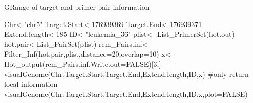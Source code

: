 \documentclass[a4paper]{book}
\begin{document}
%
\begin{Value}
GRange of target and primer pair information
\end{Value}
%
\begin{Examples}
\begin{ExampleCode}
Chr<-"chr5"
Target.Start<-176939369
Target.End<-176939371
Extend.length<-185
ID<-"leukemia_36"
plist<- List_PrimerSet(hot.out)
hot.pair<-List_PairSet(plist)
rem_Pairs.inf<-Filter_Inf(hot.pair,plist,distance=20,overlap=10)
x<-Hot_output(rem_Pairs.inf,Write.out=FALSE)[3,]
visualGenome(Chr,Target.Start,Target.End,Extend.length,ID,x)
#only return local information
visualGenome(Chr,Target.Start,Target.End,Extend.length,ID,x,plot=FALSE)
\end{ExampleCode}
\end{Examples}
\printindex{}
\end{document}
